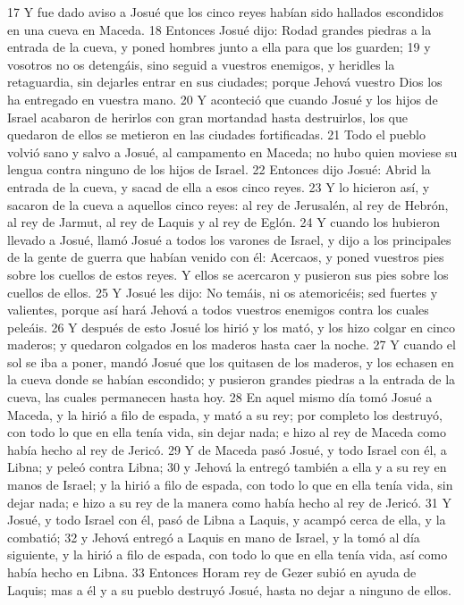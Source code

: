 17 Y fue dado aviso a Josué que los cinco reyes habían sido hallados escondidos en una cueva en Maceda.
18 Entonces Josué dijo: Rodad grandes piedras a la entrada de la cueva, y poned hombres junto a ella para que los guarden;
19 y vosotros no os detengáis, sino seguid a vuestros enemigos, y heridles la retaguardia, sin dejarles entrar en sus ciudades; porque Jehová vuestro Dios los ha entregado en vuestra mano.
20 Y aconteció que cuando Josué y los hijos de Israel acabaron de herirlos con gran mortandad hasta destruirlos, los que quedaron de ellos se metieron en las ciudades fortificadas.
21 Todo el pueblo volvió sano y salvo a Josué, al campamento en Maceda; no hubo quien moviese su lengua contra ninguno de los hijos de Israel.
22 Entonces dijo Josué: Abrid la entrada de la cueva, y sacad de ella a esos cinco reyes.
23 Y lo hicieron así, y sacaron de la cueva a aquellos cinco reyes: al rey de Jerusalén, al rey de Hebrón, al rey de Jarmut, al rey de Laquis y al rey de Eglón.
24 Y cuando los hubieron llevado a Josué, llamó Josué a todos los varones de Israel, y dijo a los principales de la gente de guerra que habían venido con él: Acercaos, y poned vuestros pies sobre los cuellos de estos reyes. Y ellos se acercaron y pusieron sus pies sobre los cuellos de ellos.
25 Y Josué les dijo: No temáis, ni os atemoricéis; sed fuertes y valientes, porque así hará Jehová a todos vuestros enemigos contra los cuales peleáis.
26 Y después de esto Josué los hirió y los mató, y los hizo colgar en cinco maderos; y quedaron colgados en los maderos hasta caer la noche.
27 Y cuando el sol se iba a poner, mandó Josué que los quitasen de los maderos, y los echasen en la cueva donde se habían escondido; y pusieron grandes piedras a la entrada de la cueva, las cuales permanecen hasta hoy.
28 En aquel mismo día tomó Josué a Maceda, y la hirió a filo de espada, y mató a su rey; por completo los destruyó, con todo lo que en ella tenía vida, sin dejar nada; e hizo al rey de Maceda como había hecho al rey de Jericó.
29 Y de Maceda pasó Josué, y todo Israel con él, a Libna; y peleó contra Libna;
30 y Jehová la entregó también a ella y a su rey en manos de Israel; y la hirió a filo de espada, con todo lo que en ella tenía vida, sin dejar nada; e hizo a su rey de la manera como había hecho al rey de Jericó.
31 Y Josué, y todo Israel con él, pasó de Libna a Laquis, y acampó cerca de ella, y la combatió;
32 y Jehová entregó a Laquis en mano de Israel, y la tomó al día siguiente, y la hirió a filo de espada, con todo lo que en ella tenía vida, así como había hecho en Libna.
33 Entonces Horam rey de Gezer subió en ayuda de Laquis; mas a él y a su pueblo destruyó Josué, hasta no dejar a ninguno de ellos.
